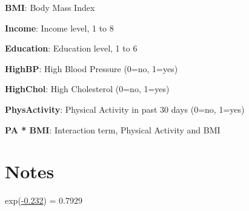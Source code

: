 \documentclass[11pt]{article}
\begin{document}
\begin{codeoutput}
\begin{table}[h]
\begin{threeparttable}
\begin{tablenotes}
\item \textbf{BMI}: Body Mass Index
\item \textbf{Income}: Income level, 1 to 8
\item \textbf{Education}: Education level, 1 to 6
\item \textbf{HighBP}: High Blood Pressure (0=no, 1=yes)
\item \textbf{HighChol}: High Cholesterol (0=no, 1=yes)
\item \textbf{PhysActivity}: Physical Activity in past 30 days (0=no, 1=yes)
\item \textbf{PA * BMI}: Interaction term, Physical Activity and BMI
\end{tablenotes}
\end{threeparttable}
\end{table}

\end{codeoutput}

\section{Notes}

\noindent

exp(\hyperlink{B1a}{-0.232}) = 0.7929
\end{document}

